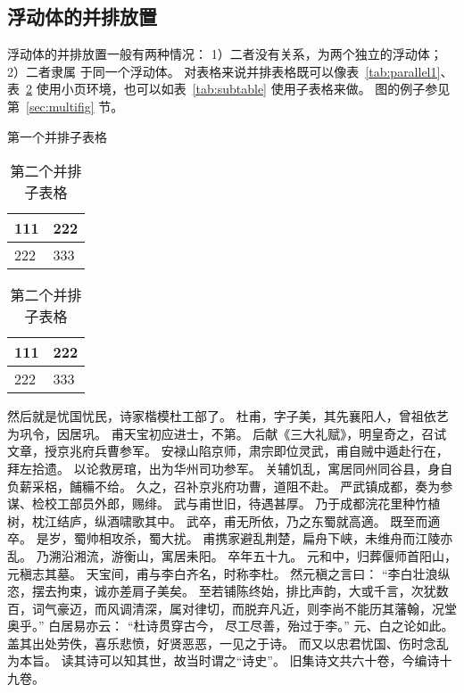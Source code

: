 \documentclass[../Main/thesis.tex]{subfiles}
\begin{document}
\subsection{浮动体的并排放置}
浮动体的并排放置一般有两种情况：
1）二者没有关系，为两个独立的浮动体；
2）二者隶属
于同一个浮动体。
对表格来说并排表格既可以像表~\ref{tab:parallel1}、表~\ref{tab:parallel2}
使用小页环境，也可以如表~\ref{tab:subtable} 使用子表格来做。
图的例子参见第~\ref{sec:multifig} 节。
\begin{table}[ht]
  \noindent\begin{minipage}{0.5\textwidth}
    \centering
    \caption{第一个并排子表格}
    \label{tab:parallel1}
    \begin{tabular}{p{2cm}p{2cm}}
      \toprule[1.5pt]
      111 & 222 \\\midrule[1pt]
      222 & 333 \\\bottomrule[1.5pt]
    \end{tabular}
  \end{minipage}
  \begin{minipage}{0.5\textwidth}
    \centering
    \caption{第二个并排子表格}
    \label{tab:parallel2}
    \begin{tabular}{p{2cm}p{2cm}}
      \toprule[1.5pt]
      111 & 222 \\\midrule[1pt]
      222 & 333 \\\bottomrule[1.5pt]
    \end{tabular}
  \end{minipage}
\end{table}

然后就是忧国忧民，诗家楷模杜工部了。
杜甫，字子美，其先襄阳人，曾祖依艺为巩令，因居巩。
甫天宝初应进士，不第。
后献《三大礼赋》，明皇奇之，召试文章，授京兆府兵曹参军。
安禄山陷京师，肃宗即位灵武，甫自贼中遁赴行在，拜左拾遗。
以论救房琯，出为华州司功参军。
关辅饥乱，寓居同州同谷县，身自负薪采梠，餔糒不给。
久之，召补京兆府功曹，道阻不赴。
严武镇成都，奏为参谋、检校工部员外郎，赐绯。
武与甫世旧，待遇甚厚。
乃于成都浣花里种竹植树，枕江结庐，纵酒啸歌其中。
武卒，甫无所依，乃之东蜀就高適。
既至而適卒。
是岁，蜀帅相攻杀，蜀大扰。
甫携家避乱荆楚，扁舟下峡，未维舟而江陵亦乱。
乃溯沿湘流，游衡山，寓居耒阳。
卒年五十九。
元和中，归葬偃师首阳山，元稹志其墓。
天宝间，甫与李白齐名，时称李杜。
然元稹之言曰：
“李白壮浪纵恣，摆去拘束，诚亦差肩子美矣。
至若铺陈终始，排比声韵，大或千言，次犹数百，词气豪迈，而风调清深，属对律切，而脱弃凡近，则李尚不能历其藩翰，况堂奥乎。”
白居易亦云：
“杜诗贯穿古今，  尽工尽善，殆过于李。”
元、白之论如此。
盖其出处劳佚，喜乐悲愤，好贤恶恶，一见之于诗。
而又以忠君忧国、伤时念乱为本旨。
读其诗可以知其世，故当时谓之“诗史”。
旧集诗文共六十卷，今编诗十九卷。
\end{document}
